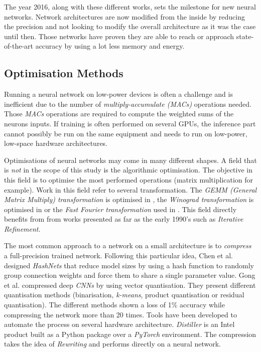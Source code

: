 The year 2016, along with these different works, sets the milestone for new neural networks. Network architectures are now modified from the inside by reducing the precision and not looking to modify the overall architecture as it was the case until then. Those networks have proven they are able to reach or approach state-of-the-art accuracy by using a lot less memory and energy.


\subsection{Optimisation Methods}

Running a neural network on low-power devices is often a challenge and is inefficient due to the number of \emph{multiply-accumulate (MACs)} operations needed. Those \emph{MACs} operations are required to compute the weighted sums of the neurons inputs. If training is often performed on several GPUs, the inference part cannot possibly be run on the same equipment and needs to run on low-power, low-space hardware architectures.

Optimisations of neural networks may come in many different shapes. A field that is \emph{not} in the scope of this study is the algorithmic optimisation. The objective in this field is to optimise the most performed operations (matrix multiplication for example). Work in this field refer to several transformation. The \emph{GEMM (General Matrix Multiply) transformation} is optimised in \cite{Cong2014, Chellapilla2006}, the \emph{Winograd transformation} is optimised in \cite{Aydonat2017} or the \emph{Fast Fourier transformation} used in \cite{Ko2017}. This field directly benefits from from works presented as far as the early 1990's such as \emph{Iterative Refinement}.

The most common approach to  a network on a small architecture is to \emph{compress} a full-precision trained network. Following this particular idea, Chen et al. \cite{Chen2015} designed \emph{HashNets} that reduce model sizes by using a hash function to randomly group connection weights and force them to share a single parameter value.  Gong et al. \cite{Gong2014} compressed deep \emph{CNNs} by using vector quantisation. They present different quantisation methods (binarisation, \emph{k-means}, product quantisation or residual quantisation). The different methods shown a loss of 1\% accuracy while compressing the network more than 20 times. Tools have been developed to automate the process on several hardware architecture. \emph{Distiller} \cite{Nzmora2019} is an Intel product built as a Python package over a \emph{PyTorch} environment. The compression takes the idea of \emph{Rewriting} and performs directly on a neural network.

